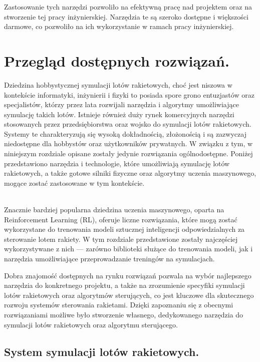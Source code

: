 Zastosowanie tych narzędzi pozwoliło na efektywną pracę nad projektem oraz
na stworzenie tej pracy inżynierskiej. Narzędzia te są szeroko dostępne i
większości darmowe, co pozwoliło na ich wykorzystanie w ramach pracy inżynierskiej.

\section{Przegląd dostępnych rozwiązań. }

Dziedzina hobbystycznej symulacji lotów rakietowych, choć jest niszowa w
kontekście informatyki, inżynierii i fizyki to posiada spore grono entuzjastów
oraz specjalistów, którzy przez lata rozwijali narzędzia i algorytmy umożliwiające symulację takich lotów. Istnieje również duży rynek komercyjnych narzędzi stosowanych przez przedsiębiorstwa oraz wojsko do symulacji lotów rakietowych. Systemy te charakteryzują się wysoką dokładnością, złożonością i są zazwyczaj niedostępne dla hobbystów oraz użytkowników prywatnych. W związku z tym, w niniejszym rozdziale opisane zostały jedynie rozwiązania ogólnodostępne. Poniżej przedstawiono narzędzia i technologie, które umożliwiają symulację lotów rakietowych, a także gotowe silniki fizyczne oraz algorytmy uczenia maszynowego, mogące zostać zastosowane w tym kontekście.

\\Znacznie bardziej popularna dziedzina uczenia maszynowego, oparta na
Reinforcement Learning (RL), oferuje liczne rozwiązania, które mogą zostać wykorzystane do trenowania modeli sztucznej inteligencji odpowiedzialnych za sterowanie lotem rakiety. W tym rozdziale przedstawione zostały najczęściej wykorzystywane z nich — zarówno biblioteki służące do trenowania modeli, jak i narzędzia umożliwiające przeprowadzanie treningów na symulacjach.

Dobra znajomość dostępnych na rynku rozwiązań pozwala na wybór najlepszego
narzędzia do konkretnego projektu, a także na zrozumienie specyfiki
symulacji lotów rakietowych oraz algorytmów sterujących, co jest kluczowe
dla skutecznego rozwoju systemów sterowania rakietami. Dzięki zapoznaniu się
z obecnymi rozwiązaniami możliwe było stworzenie własnego, dedykowanego
narzędzia do symulacji lotów rakietowych oraz algorytmu sterującego.


\subsection{System symulacji lotów rakietowych.}

